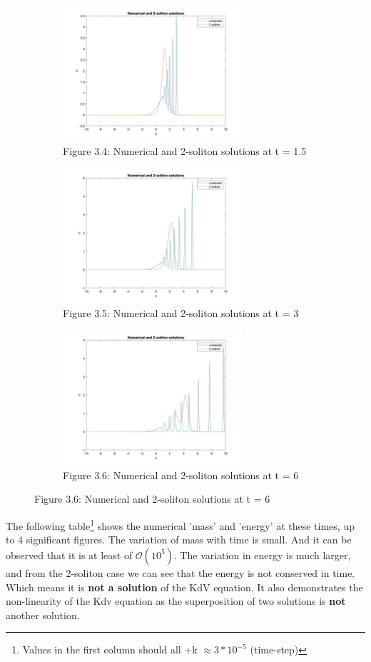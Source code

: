 \documentclass[a4paper,11pt]{article}
\begin{document}
\begin{figure}[H]
\begin{subfigure}{0.5\textwidth}
\end{subfigure}
\begin{subfigure}{0.5\textwidth}
\includegraphics[width = \linewidth, height = 5cm]{Q3(4).jpg}
\caption{Figure 3.4: Numerical and 2-soliton solutions at t = 1.5 }
\label{Q2(4)}
\end{subfigure}
\begin{subfigure}{0.5\textwidth}
\includegraphics[width = \linewidth, height = 5cm]{Q3(5).jpg}
\caption{Figure 3.5: Numerical and 2-soliton solutions at t = 3}
\label{Q2(5)}
\end{subfigure}
\begin{subfigure}{0.5\textwidth}
\includegraphics[width = \linewidth, height = 5cm]{Q3(6).jpg}
\caption{Figure 3.6: Numerical and 2-soliton solutions at t = 6}
\label{Q2(6)}
\end{subfigure}
\end{figure}
The following table\footnote{Values in the first column should all +k $\approx 3*10^{-5}$ (time-step)} shows the numerical 'mass' and 'energy' at these times, up to 4 significant figures. The variation of mass with time is small. And it can be observed that it is at least of $\mathcal{O}(10^5)$. The variation in energy is much larger, and from the 2-soliton case we can see that the energy is not conserved in time. Which means it is \textbf{not a solution} of the KdV equation. It also demonstrates the non-linearity of the Kdv equation as the superposition of two solutions is \textbf{not} another solution. 
\end{document}
